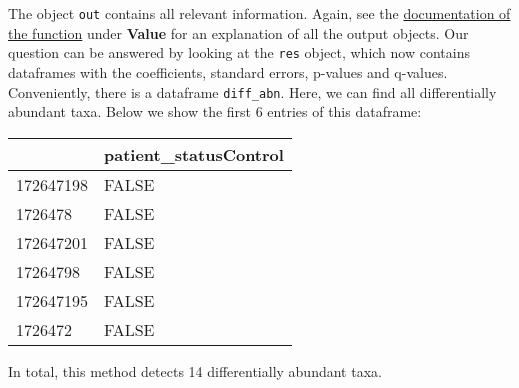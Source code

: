 \documentclass[
  oneside]{book}
\newenvironment{Shaded}{\begin{snugshade}}{\end{snugshade}}
\newcommand{\AttributeTok}[1]{\textcolor[rgb]{0.77,0.63,0.00}{#1}}
\newcommand{\ConstantTok}[1]{\textcolor[rgb]{0.00,0.00,0.00}{#1}}
\newcommand{\FloatTok}[1]{\textcolor[rgb]{0.00,0.00,0.81}{#1}}
\newcommand{\FunctionTok}[1]{\textcolor[rgb]{0.00,0.00,0.00}{#1}}
\newcommand{\NormalTok}[1]{#1}
\newcommand{\SpecialCharTok}[1]{\textcolor[rgb]{0.00,0.00,0.00}{#1}}
\newcommand{\StringTok}[1]{\textcolor[rgb]{0.31,0.60,0.02}{#1}}
\begin{document}
The object \texttt{out} contains all relevant information. Again, see the
\href{https://rdrr.io/github/FrederickHuangLin/ANCOMBC/man/ancombc.html}{documentation of the function}
under \textbf{Value} for an explanation of all the output objects. Our question can be answered
by looking at the \texttt{res} object, which now contains dataframes with the coefficients,
standard errors, p-values and q-values. Conveniently, there is a dataframe \texttt{diff\_abn}.
Here, we can find all differentially abundant taxa. Below we show the first 6 entries of this dataframe:

\begin{Shaded}
\end{Shaded}

\begin{table}
\centering
\begin{tabular}{l|l}
\hline
  & patient\_statusControl\\
\hline
172647198 & FALSE\\
\hline
1726478 & FALSE\\
\hline
172647201 & FALSE\\
\hline
17264798 & FALSE\\
\hline
172647195 & FALSE\\
\hline
1726472 & FALSE\\
\hline
\end{tabular}
\end{table}

In total, this method detects 14 differentially abundant taxa.

\begin{Shaded}
\end{Shaded}
\end{document}
